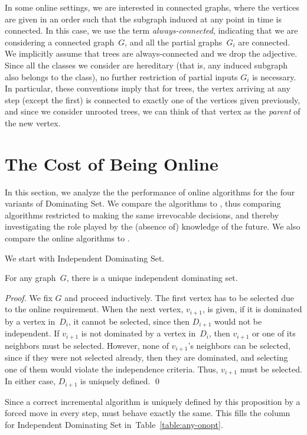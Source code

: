 In some online settings,
we are interested in connected graphs, where the vertices are given
in an order such that the subgraph induced at any point
in time is connected.
In this case, we use the term
\emph{always-connected},
indicating that we are considering a connected graph~$G$, and
all the partial graphs~$G_i$ are connected.
We implicitly assume that trees are always-connected and we drop the adjective.
Since all the classes we consider are hereditary (that is, any induced subgraph
also belongs to the class), no further restriction of partial inputs
$G_i$ is necessary. In particular, these conventions 
imply that for trees, the vertex arriving at any step (except the first) is
connected to exactly one of the vertices given previously, and since we
consider unrooted trees, we can think of that vertex as the \emph{parent} of the
new vertex.


\section{The Cost of Being Online}

In this section, we analyze the the performance of online algorithms
for the four variants of Dominating Set.
We compare the algorithms to \onopt, thus comparing algorithms restricted
to making the same irrevocable decisions, and thereby
investigating the role played by the
(absence of) knowledge of the future.
We also compare the online algorithms to \offopt.

We start with Independent Dominating Set.
\begin{proposition}
For any graph~$G$, there is a unique \incr independent dominating set.
\end{proposition}
\begin{proof}
We fix $G$ and proceed inductively.
The first vertex has to be selected due to the online requirement.
When the next vertex, $v_{i+1}$, is given, if it is dominated by a vertex 
in~$D_i$,
it cannot be selected, since then $D_{i+1}$ would not be independent.
If $v_{i+1}$ is not dominated by a vertex in~$D_i$, then
$v_{i+1}$ or one of its neighbors must be selected.
However, none of $v_{i+1}$'s neighbors can be selected, since if they
were not selected already, then they are dominated, and selecting one
of them would violate the independence criteria.
Thus, $v_{i+1}$ must be selected.
In either case, $D_{i+1}$ is uniquely defined. 
\qed\end{proof}

Since a correct incremental algorithm is uniquely defined by this proposition
by a forced move in every step, \onopt must behave exactly the same.
This fills the column for Independent Dominating Set
in~Table~\ref{table:any-onopt}.

